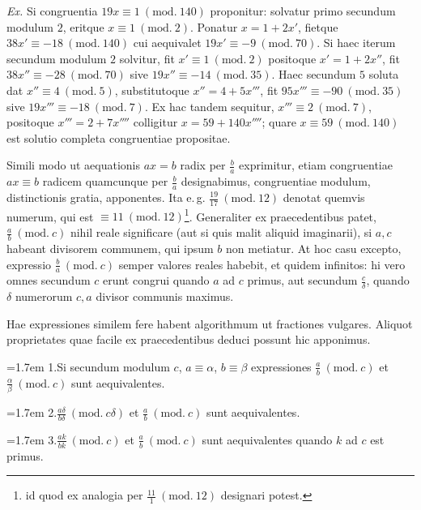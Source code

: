 \emph{Ex.} Si congruentia $19x\equiv 1 \ (\mathrm{mod.}\ 140)$ proponitur: solvatur primo secundum
modulum $2$, eritque $x\equiv 1\ (\mathrm{mod.}\ 2)$. Ponatur $x=1+2x'$, fietque $38x'\equiv -18\ (\mathrm{mod.}\ 140)$
cui aequivalet $19x'\equiv -9\ (\mathrm{mod.}\ 70)$. Si haec
iterum secundum modulum $2$ solvitur, fit $x'\equiv 1\ (\mathrm{mod.}\ 2)$ positoque
$x'=1+2x''$, fit $38x''\equiv -28\ (\mathrm{mod.}\ 70)$ sive $19x''\equiv -14\ (\mathrm{mod.}\ 35)$.
Haec secundum $5$ soluta dat $x''\equiv 4\ (\mathrm{mod.}\ 5)$, substitutoque $x''=4+5x'''$,
fit $95x'''\equiv -90\ (\mathrm{mod.}\ 35)$ sive $19x'''\equiv -18\ (\mathrm{mod.}\ 7)$.
Ex hac tandem sequitur, $x'''\equiv 2\ (\mathrm{mod.}\ 7)$, positoque $x'''=2+7x''''$
colligitur $x=59+140x''''$; quare $x\equiv 59\ (\mathrm{mod.}\ 140)$ est solutio completa
congruentiae propositae.


Simili modo ut aequationis $ax=b$ radix per $\frac{b}{a}$ exprimitur, etiam congruentiae
$ax\equiv b$ radicem quamcunque per $\frac{b}{a}$ designabimus, congruentiae modulum,
distinctionis gratia, apponentes. Ita e.\,g. $\frac{19}{17}\ (\mathrm{mod.}\ 12)$ denotat quemvis
numerum, qui est $\equiv 11\ (\mathrm{mod.}\ 12)$\begingroup\renewcommand{\thefootnote}{*)}\footnote{id quod ex analogia per $\frac{11}{1}\ (\mathrm{mod.}\ 12)$ designari potest.}\endgroup. Generaliter ex praecedentibus patet,
$\frac{a}{b}\ (\mathrm{mod.}\ c)$ nihil reale significare (aut si quis malit aliquid imaginarii), si
$a,c$ habeant divisorem communem, qui ipsum $b$ non metiatur. At hoc casu excepto,
expressio $\frac{b}{a}\ (\mathrm{mod.}\ c)$ semper valores reales habebit, et quidem infinitos: hi vero
omnes secundum $c$ erunt congrui quando $a$ ad $c$ primus, aut secundum $\frac{c}{\delta}$,
quando $\delta$ numerorum $c,a$ divisor communis maximus.

Hae expressiones similem fere habent algorithmum ut fractiones vulgares. Aliquot
proprietates quae facile ex praecedentibus deduci possunt hic apponimus.

\hangindent=1.7em
1.\quad Si secundum modulum $c$, $a\equiv\alpha$, $b\equiv\beta$ expressiones
$\frac{a}{b}\ (\mathrm{mod.}\ c)$ et $\frac{\alpha}{\beta}\ (\mathrm{mod.}\ c)$ sunt aequivalentes.

\hangindent=1.7em
2.\quad $\frac{a\delta}{b\delta}\ (\mathrm{mod.}\ c\delta)$ et $\frac{a}{b}\ (\mathrm{mod.}\ c)$ sunt aequivalentes.

\hangindent=1.7em
3.\quad $\frac{ak}{bk}\ (\mathrm{mod.}\ c)$ et $\frac{a}{b}\ (\mathrm{mod.}\ c)$ sunt aequivalentes quando $k$ ad $c$ est primus.

